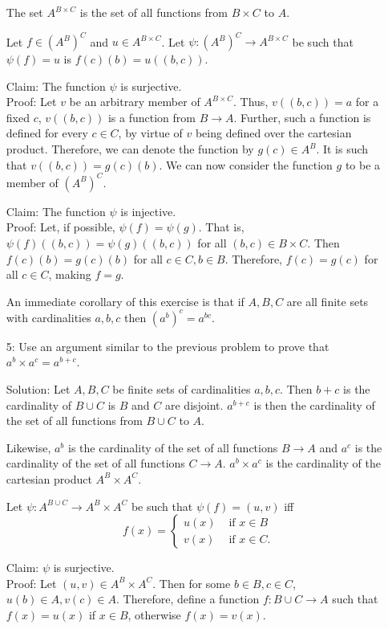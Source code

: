 \begin{enumerate}
The set $A^{B \times C}$ is the set of all functions from $B \times C$ to
$A$.

Let $f \in (A^B)^C$ and $u \in A^{B \times C}$. Let $\psi: (A^B)^C
\rightarrow A^{B \times C}$ be such that $\psi(f) = u$ is $f(c)(b) = 
u((b, c))$. 

Claim: The function $\psi$ is surjective.\\
Proof: Let $v$ be an arbitrary member of $A^{B \times C}$. Thus, $v((b, c))
= a$ for a fixed $c$, $v((b, c))$ is a function from $B \rightarrow A$.
Further, such a function is defined for every $c \in C$, by virtue of $v$
being defined over the cartesian product. Therefore, we can denote the
function by $g(c) \in A^B$. It is such that $v((b, c)) = g(c)(b)$. We can
now consider the function $g$ to be a member of $(A^B)^C$.

Claim: The function $\psi$ is injective.\\
Proof: Let, if possible, $\psi(f) = \psi(g)$. That is, $\psi(f)((b, c)) = 
\psi(g)((b, c))$ for all $(b, c) \in B \times C$. Then $f(c)(b) = g(c)(b)$
for all $c \in C, b \in B$. Therefore, $f(c) = g(c)$ for all $c \in C$,
making $f = g$.

\begin{rem}
An immediate corollary of this exercise is that if $A, B, C$ are all finite
sets with cardinalities $a, b, c$ then $(a^b)^c = a^{bc}$.
\end{rem}

\item[5:] Use an argument similar to the previous problem to prove that
$a^b \times a^c = a^{b + c}$.
\item[Solution:] Let $A, B, C$ be finite sets of cardinalities $a, b, c$.
Then $b + c$ is the cardinality of $B \cup C$ is $B$ and $C$ are disjoint.
$a^{b + c}$ is then the cardinality of the set of all functions from 
$B \cup C$ to $A$.

Likewise, $a^b$ is the cardinality of the set of all functions $B 
\rightarrow A$ and $a^c$ is the cardinality of the set of all functions $
C \rightarrow A$. $a^b \times a^c$ is the cardinality of the cartesian
product $A^B \times A^C$.

Let $\psi: A^{B \cup C} \rightarrow A^B \times A^C$ be such that $\psi(f)
= (u, v)$ iff
\[
f(x) = \begin{cases} u(x) & \text{ if } x \in B \\
v(x) & \text{ if } x \in C.
\end{cases}
\]

Claim: $\psi$ is surjective. \\
Proof: Let $(u, v) \in A^B \times A^C$. Then for some $b \in B, c \in C$,
$u(b) \in A, v(c) \in A$. Therefore, define a function $f: B \cup C
\rightarrow A$ such that $f(x) = u(x)$ if $x \in B$, otherwise $f(x) = v(x)
$.


\end{enumerate}
